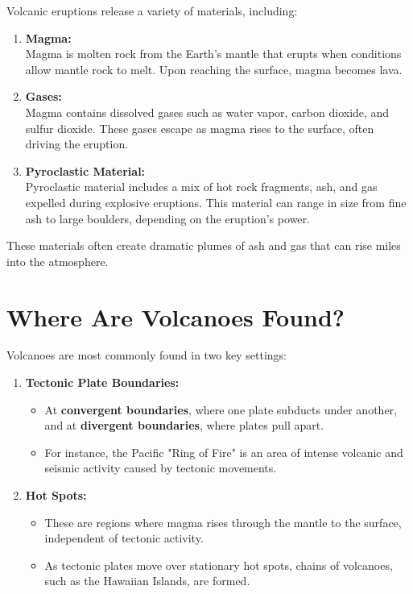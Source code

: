 \documentclass{article}
\begin{document}
Volcanic eruptions release a variety of materials, including:

\begin{enumerate}
    \item \textbf{Magma:} \\
    Magma is molten rock from the Earth's mantle that erupts when conditions allow mantle rock to melt. Upon reaching the surface, magma becomes lava.

    \item \textbf{Gases:} \\
    Magma contains dissolved gases such as water vapor, carbon dioxide, and sulfur dioxide. These gases escape as magma rises to the surface, often driving the eruption.

    \item \textbf{Pyroclastic Material:} \\
    Pyroclastic material includes a mix of hot rock fragments, ash, and gas expelled during explosive eruptions. This material can range in size from fine ash to large boulders, depending on the eruption's power.
\end{enumerate}

These materials often create dramatic plumes of ash and gas that can rise miles into the atmosphere.

\section*{Where Are Volcanoes Found?}

Volcanoes are most commonly found in two key settings:

\begin{enumerate}
    \item \textbf{Tectonic Plate Boundaries:}
    \begin{itemize}
        \item At \textbf{convergent boundaries}, where one plate subducts under another, and at \textbf{divergent boundaries}, where plates pull apart.
        \item For instance, the Pacific "Ring of Fire" is an area of intense volcanic and seismic activity caused by tectonic movements.
    \end{itemize}

    \item \textbf{Hot Spots:}
    \begin{itemize}
        \item These are regions where magma rises through the mantle to the surface, independent of tectonic activity.
        \item As tectonic plates move over stationary hot spots, chains of volcanoes, such as the Hawaiian Islands, are formed.
    \end{itemize}
\end{enumerate}
\end{document}
